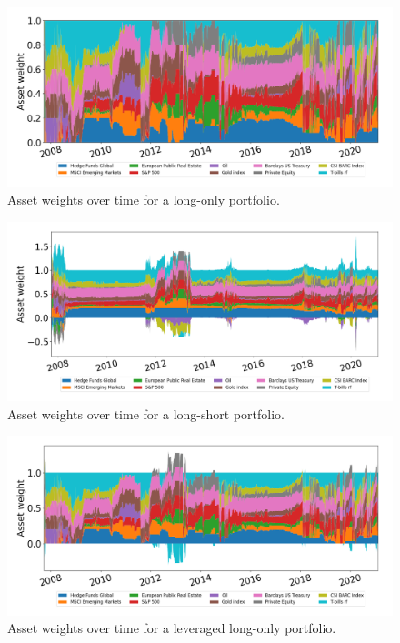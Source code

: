 \begin{figure}[H]
    \centering
    \includegraphics[width=1\textwidth]{analysis/portfolio_exercise/images/mle/weights_lo.png}
    \caption[Asset weights over time for a long-only portfolio]{Asset weights over time for a long-only portfolio.}
    \label{fig:MPC_port_weights_lo}
\end{figure}

\begin{figure}[H]
    \centering
    \includegraphics[width=1\textwidth]{analysis/portfolio_exercise/images/mle/weights_ls.png}
    \caption[Asset weights over time for a long-short portfolio]{Asset weights over time for a long-short portfolio.}
    \label{fig:MPC_port_weights_ls}
\end{figure}

\begin{figure}[H]
    \centering
    \includegraphics[width=1\textwidth]{analysis/portfolio_exercise/images/mle/weights_llo.png}
    \caption[Asset weights over time for a leveraged long-only portfolio]{Asset weights over time for a leveraged long-only portfolio.}
    \label{fig:MPC_port_weights_llo}
\end{figure}

